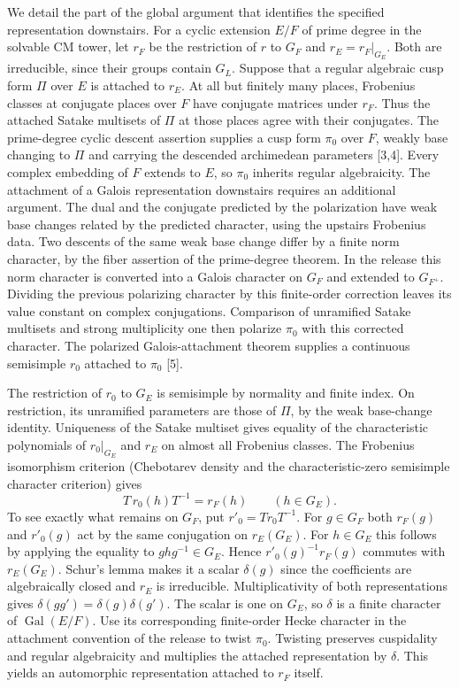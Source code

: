 We detail the part of the global argument that identifies the specified representation downstairs. For a cyclic extension $E/F$ of prime degree in the solvable CM tower, let $r_F$ be the restriction of $r$ to $G_F$ and $r_E=r_F|_{G_E}$. Both are irreducible, since their groups contain $G_L$. Suppose that a regular algebraic cusp form $\Pi$ over $E$ is attached to $r_E$. At all but finitely many places, Frobenius classes at conjugate places over $F$ have conjugate matrices under $r_F$. Thus the attached Satake multisets of $\Pi$ at those places agree with their conjugates. The prime-degree cyclic descent assertion supplies a cusp form $\pi_0$ over $F$, weakly base changing to $\Pi$ and carrying the descended archimedean parameters [3,4]. Every complex embedding of $F$ extends to $E$, so $\pi_0$ inherits regular algebraicity. The attachment of a Galois representation downstairs requires an additional argument. The dual and the conjugate predicted by the polarization have weak base changes related by the predicted character, using the upstairs Frobenius data. Two descents of the same weak base change differ by a finite norm character, by the fiber assertion of the prime-degree theorem. In the release this norm character is converted into a Galois character on $G_F$ and extended to $G_{F^+}$. Dividing the previous polarizing character by this finite-order correction leaves its value constant on complex conjugations. Comparison of unramified Satake multisets and strong multiplicity one then polarize $\pi_0$ with this corrected character. The polarized Galois-attachment theorem supplies a continuous semisimple $r_0$ attached to $\pi_0$ [5].

The restriction of $r_0$ to $G_E$ is semisimple by normality and finite index. On restriction, its unramified parameters are those of $\Pi$, by the weak base-change identity. Uniqueness of the Satake multiset gives equality of the characteristic polynomials of $r_0|_{G_E}$ and $r_E$ on almost all Frobenius classes. The Frobenius isomorphism criterion (Chebotarev density and the characteristic-zero semisimple character criterion) gives
\[
                     T\,r_0(h)T^{-1}=r_F(h)
                         \qquad(h\in G_E).
\]
To see exactly what remains on $G_F$, put $r'_0=T r_0 T^{-1}$. For $g\in G_F$ both $r_F(g)$ and $r'_0(g)$ act by the same conjugation on $r_E(G_E)$. For $h\in G_E$ this follows by applying the equality to $ghg^{-1}\in G_E$. Hence $r'_0(g)^{-1}r_F(g)$ commutes with $r_E(G_E)$. Schur's lemma makes it a scalar $\delta(g)$ since the coefficients are algebraically closed and $r_E$ is irreducible. Multiplicativity of both representations gives $\delta(gg')=\delta(g)\delta(g')$. The scalar is one on $G_E$, so $\delta$ is a finite character of $\operatorname{Gal}(E/F)$. Use its corresponding finite-order Hecke character in the attachment convention of the release to twist $\pi_0$. Twisting preserves cuspidality and regular algebraicity and multiplies the attached representation by $\delta$. This yields an automorphic representation attached to $r_F$ itself.

